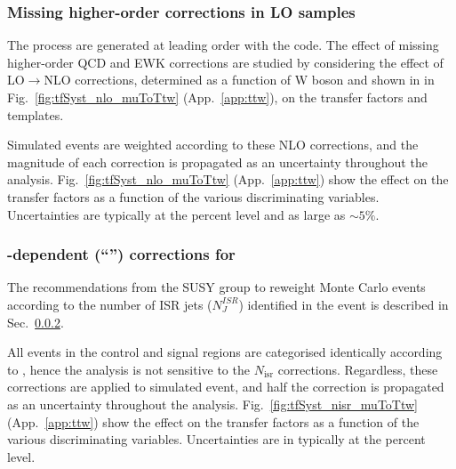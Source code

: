 \subsubsection{Missing higher-order corrections in LO \texorpdfstring{\MADGRAPH}{MadGraph}
  samples}
\label{sec:nlo}

The \wj process are generated at leading order with the \MADGRAPH
code. The effect of missing higher-order QCD and EWK corrections are
studied by considering the effect of LO$\rightarrow$NLO corrections,
determined as a function of W boson \Pt and shown in in
Fig.~\ref{fig:tfSyst_nlo_muToTtw} (App.~\ref{app:ttw}), on the
transfer factors and \HTmiss templates. 

Simulated \wj events are weighted according to these NLO corrections,
and the magnitude of each correction is propagated as an uncertainty
throughout the analysis. Fig.~\ref{fig:tfSyst_nlo_muToTtw}
(App.~\ref{app:ttw}) show the effect on the transfer factors as a
function of the various discriminating variables. Uncertainties are
typically at the percent level and as large as $\sim 5\%$.


\subsubsection{\texorpdfstring{\njet}{Njet}-dependent (``\texorpdfstring{\nisr}{Nisr}'') corrections for \texorpdfstring{\ttbar}{TTbar}}
\label{sec:nisr}

The recommendations from the SUSY group to reweight \MADGRAPH \ttbar
Monte Carlo events according to the number of ISR jets ($N_J^{ISR}$)
identified in the event is described in
Sec.~\ref{sec:nisr}. 

All events in the control and signal regions are categorised
identically according to \njet, hence the analysis is not sensitive to
the $N_\textrm{isr}$ corrections. Regardless, these corrections are
applied to simulated \ttbar event, and half the correction is
propagated as an uncertainty throughout the
analysis. Fig.~\ref{fig:tfSyst_nisr_muToTtw} (App.~\ref{app:ttw}) show
the effect on the transfer factors as a function of the various
discriminating variables. Uncertainties are in typically at the
percent level. 

